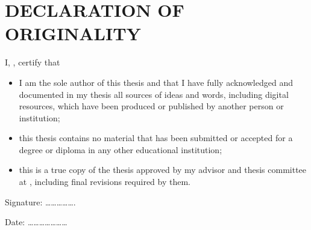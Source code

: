 \chapter*{\MakeUppercase{declaration of originality}}

\vspace*{20pt}

\noindent I, \authname, certify that 
\begin{itemize} 
	\item I am the sole author of this thesis and that I have fully acknowledged and documented in my thesis all sources of ideas and words, including digital resources, which have been produced or published by another person or institution;
	\item this thesis contains no material that has been submitted or accepted for a degree or diploma in any other educational institution;
	\item this is a true copy of the thesis approved by my advisor and thesis committee at \univname, including final revisions required by them.
\end{itemize}
 
\vspace{40pt}

\noindent Signature: \ldots\ldots\ldots\ldots\ldots.
 
\noindent Date: \ldots\ldots\ldots\ldots\ldots\ldots\dots


